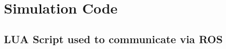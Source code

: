 \chapter{Simulation Code}
\label{ch:Appendix-Simulation-Code} 
\section{LUA Script used to communicate via ROS}


